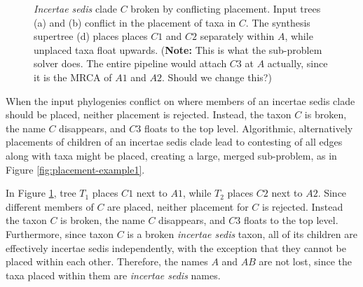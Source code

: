 \documentclass[english]{article}
\begin{document}
\begin{figure}
{}\hfill{}\hfill{}

\caption{\label{fig:Broken-incertae-sedis} \emph{Incertae sedis} clade $C$
broken by conflicting placement.
Input trees (a) and (b) conflict
in the placement of taxa in $C$.
The synthesis supertree (d) places
places $C1$ and $C2$ separately within $A$, while unplaced taxa
float upwards.
(\textbf{Note:} This is what the sub-problem solver
does.
The entire pipeline would attach $C3$ at $A$ actually, since
it is the MRCA of $A1$ and $A2$.
Should we change this?) }

\end{figure}

When the input phylogenies conflict on where members of an incertae
sedis clade should be placed, neither placement is rejected.
Instead,
the taxon $C$ is broken, the name $C$ disappears, and $C3$ floats to
the top level.
Algorithmic, alternatively placements of children of an
incertae sedis clade lead to contesting of all edges along with taxa
might be placed, creating a large, merged sub-problem, as in Figure
\ref{fig:placement-example1}.

In Figure \ref{fig:Broken-incertae-sedis}, tree $T_{1}$ places $C1$
next to $A1$, while $T_{2}$ places $C2$ next to $A2$.
Since different
members of $C$ are placed, neither placement for $C$ is rejected.
Instead the taxon $C$ is broken, the name $C$ disappears, and $C3$
floats to the top level.
Furthermore, since taxon $C$ is a broken
\emph{incertae sedis }taxon, all of its children are effectively
incertae sedis independently, with the exception that they cannot be
placed within each other.
Therefore, the names $A$ and $AB$ are not
lost, since the taxa placed within them are \emph{incertae sedis}
names.
\end{document}
